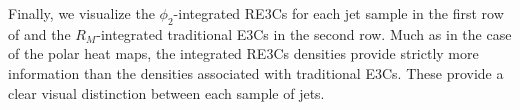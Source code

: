 Finally, we visualize the \(\phi_2\)-integrated RE3Cs for each jet sample in the first row of  and the \(R_M\)-integrated traditional E3Cs in the second row.
%
Much as in the case of the polar heat maps, the integrated RE3Cs densities provide strictly more information than the densities associated with traditional E3Cs. These provide a clear visual distinction between each sample of jets.

\begin{figure}[ht!]
    \centering
    \\
\end{figure}
